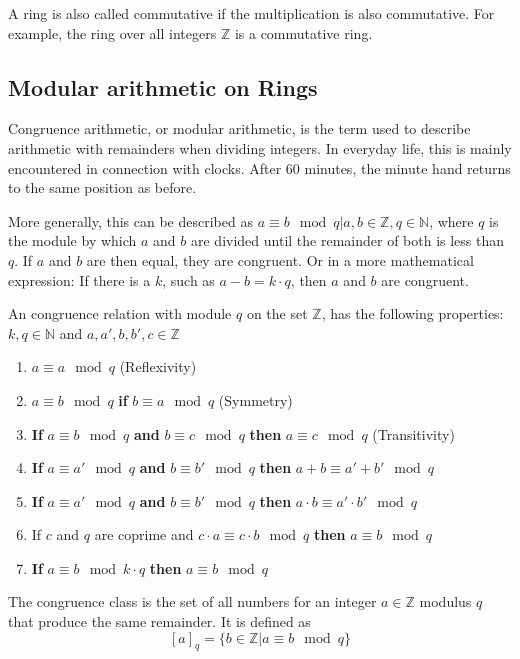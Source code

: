 A ring is also called commutative if the multiplication is also commutative. For example, the ring over all integers $\mathbb{Z}$ is a commutative ring.

\subsection*{Modular arithmetic on Rings}

Congruence arithmetic, or modular arithmetic, is the term used to describe arithmetic with remainders when dividing integers. In everyday life, this is mainly encountered in connection with clocks. After 60 minutes, the minute hand returns to the same position as before. 

More generally, this can be described as $a \equiv b \mod q | a,b \in \mathbb{Z}, q \in \mathbb{N}$, where $q$ is the module by which $a$ and $b$ are divided until the remainder of both is less than $q$. If $a$ and $b$ are then equal, they are congruent. Or in a more mathematical expression: If there is a $k$, such as $a-b = k\cdot q$, then $a$ and $b$ are congruent.

An congruence relation with module $q$ on the set $\mathbb{Z}$, has the following properties:
$k,q \in \mathbb{N}$ and $a, a', b, b', c \in \mathbb{Z}$
\begin{enumerate}
  \item $a \equiv a \mod q$ (Reflexivity)
  \item $a \equiv b \mod q$ \textbf{if} $b \equiv a \mod q$ (Symmetry)
  \item \textbf{If} $a \equiv b \mod q$ \textbf{and} $b \equiv c \mod q$ \textbf{then} $a \equiv c \mod q$ (Transitivity)
  \item \textbf{If} $a \equiv a' \mod q$ \textbf{and} $b \equiv b' \mod q$ \textbf{then} $a+b \equiv a'+b' \mod q$
  \item \textbf{If} $a \equiv a' \mod q$ \textbf{and} $b \equiv b' \mod q$ \textbf{then} $a\cdot b \equiv a'\cdot b' \mod q$
  \item If $c$ and $q$ are coprime and $c \cdot a \equiv c \cdot b \mod q$ \textbf{then} $a \equiv b \mod q$
  \item \textbf{If} $a \equiv b \mod k\cdot q$ \textbf{then} $a \equiv b \mod q$
\end{enumerate}

The congruence class is the set of all numbers for an integer $a \in \mathbb{Z}$ modulus $q$ that produce the same remainder. It is defined as
$$[a]_q = \{b \in \mathbb{Z} | a \equiv b \mod q\}$$

